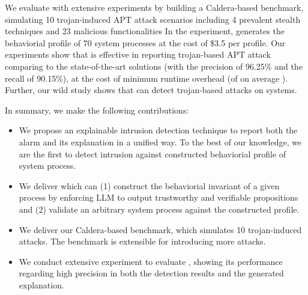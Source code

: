 We evaluate \tool with extensive experiments by building a Caldera-based benchmark,
simulating 10 trojan-induced APT attack scenarios including 
4 prevalent stealth techniques \cite{xx} and
23 malicious functionalities \cite{xx}
In the experiment, \tool generates the behaviorial profile of 70 system processes
at the cost of \$3.5 per profile.
Our experiments show that 
\tool is effective in reporting trojan-based APT attack comparing to the state-of-the-art solutions (with the precision of 96.25\% and the recall of 90.15\%),
at the cost of minimum runtime overhead (of on average ).
Further, our wild study shows that \tool can detect  trojan-based attacks on  systems.

In summary, we make the following contributions:
\begin{itemize}[leftmargin=*]
  \item We propose an explainable intrusion detection technique \tool to report both the alarm and its explanation in a unified way. 
      To the best of our knowledge, we are the first to detect intrusion against constructed behaviorial profile of system process.
  \item We deliver \tool which can 
    (1) construct the behaviorial invariant of a given process by enforcing LLM to output trustworthy and verifiable propositions and
    (2) validate an arbitrary system process against the constructed profile.
  \item We deliver our Caldera-based benchmark, which simulates 10 trojan-induced attacks. 
    The benchmark is extensible for introducing more attacks.
  \item We conduct extensive experiment to evaluate \tool, showing its performance regarding high precision in both the detection results and the generated explanation.
\end{itemize}
 





